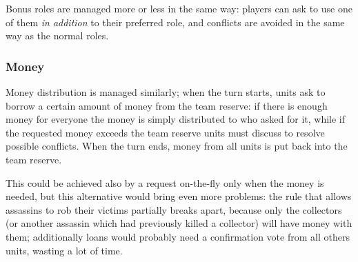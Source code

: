 				Bonus roles are managed more or less in the same way: players can ask to use one of them \emph{in addition} to their preferred role, and conflicts are avoided in the same way as the normal roles.
							
			\subsubsection{Money}
			\label{nolead:money}
				Money distribution is managed similarly; when the turn starts, units ask to borrow a certain amount of money from the team reserve: if there is enough money for everyone the money is simply distributed to who asked for it, while if the requested money exceeds the team reserve units must discuss to resolve possible conflicts.
				When the turn ends, money from all units is put back into the team reserve.
				
				This could be achieved also by a request on-the-fly only when the money is needed, but this alternative would bring even more problems: the rule that allows assassins to rob their victims partially breaks apart, because only the collectors (or another assassin which had previously killed a collector) will have money with them; additionally loans would probably need a confirmation vote from all others units, wasting a lot of time.
		